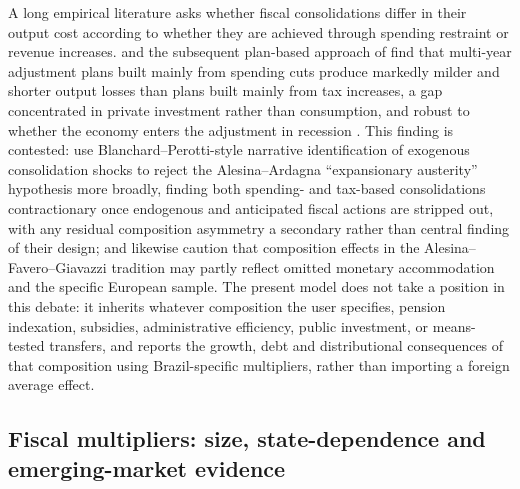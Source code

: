 \documentclass[11pt,a4paper]{article}
\begin{document}
A long empirical literature asks whether fiscal consolidations differ in their output cost according to whether they are achieved through spending restraint or revenue increases. \citet{alesinaardagna2010} and the subsequent plan-based approach of \citet{alesinafaverogiavazzi2015,alesinabarbierofaverogiavazzipardisi2015} find that multi-year adjustment plans built mainly from spending cuts produce markedly milder and shorter output losses than plans built mainly from tax increases, a gap concentrated in private investment rather than consumption, and robust to whether the economy enters the adjustment in recession \citep{alesinaazzalinietal2017}. This finding is contested: \citet{guajardoleighpescatori2014} use Blanchard--Perotti-style narrative identification of exogenous consolidation shocks to reject the Alesina--Ardagna ``expansionary austerity'' hypothesis more broadly, finding both spending- and tax-based consolidations contractionary once endogenous and anticipated fiscal actions are stripped out, with any residual composition asymmetry a secondary rather than central finding of their design; \citet{perotti2013} and \citet{jordaetal2013} likewise caution that composition effects in the Alesina--Favero--Giavazzi tradition may partly reflect omitted monetary accommodation and the specific European sample. The present model does not take a position in this debate: it inherits whatever composition the user specifies, pension indexation, subsidies, administrative efficiency, public investment, or means-tested transfers, and reports the growth, debt and distributional consequences of that composition using Brazil-specific multipliers, rather than importing a foreign average effect.

\subsection{Fiscal multipliers: size, state-dependence and emerging-market evidence}
\label{sec:lit-multipliers}
\end{document}
